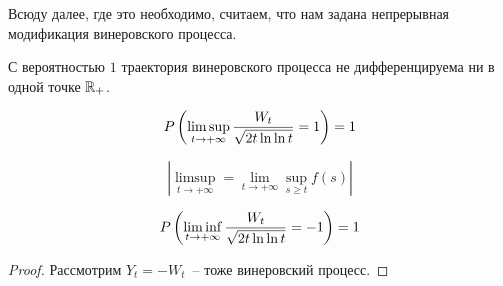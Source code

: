 \begin{remark}
Всюду далее, где это необходимо, считаем, что нам задана непрерывная модификация винеровского
процесса.
\end{remark}

\begin{theorem}
С вероятностью $1$ траектория винеровского процесса не дифференцируема ни в одной точке $\mathbb{R}_+$.
\end{theorem}
\begin{theorem}
$$P \left(  \limsup_{t \to +\infty} \frac{W_t}{\sqrt{2t \ln \ln t}} = 1  \right) = 1$$

$$ \left| \limsup_{t \to +\infty} = \lim_{t\to +\infty} \sup_{s \geq t} f(s) \right| $$
\end{theorem}
\begin{corollary}
$$P \left(  \liminf_{t \to +\infty} \frac{W_t}{\sqrt{2t \ln \ln t}} = -1  \right) = 1$$
\end{corollary}
\begin{proof}
Рассмотрим $Y_t = -W_t$~-- тоже винеровский процесс.
\end{proof}
